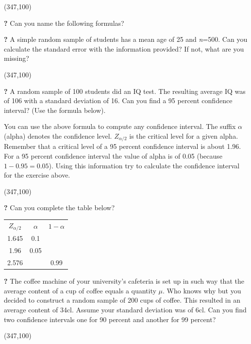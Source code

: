 \documentclass{article}
\newcommand{\forceindent}{\leavevmode{\parindent=2em\indent}}
\begin{document}
\framebox(347,100){}

\forceindent \textbf{?} Can you name the following formulas?

\begin{center}
\end{center}

\begin{center}
\end{center}

\begin{center}
\end{center}

\forceindent \textbf{?} A simple random sample of students has a mean age of 25 and \textit{n}=500. Can you calculate the standard error with the information provided? If not, what are you missing?

\framebox(347,100){}

\forceindent \textbf{?} A random sample of 100 students did an IQ test. The resulting average IQ was of 106 with a standard deviation of 16. Can you find a 95 percent confidence interval? (Use the formula below).

\begin{center}
\end{center}

You can use the above formula to compute any confidence interval. The suffix $\alpha$ (alpha) denotes the confidence level. $Z_{\alpha/2}$ is the critical level for a given alpha. Remember that a critical level of a 95 percent confidence interval is about 1.96. For a 95 percent confidence interval the value of alpha is of 0.05 (because $1-0.95=0.05$). Using this information try to calculate the confidence interval for the exercise above.

\framebox(347,100){}

\forceindent \textbf{?} Can you complete the table below?

\begin{table}[H]
	\centering
	\begin{tabular}{ccc}
		\textbf{$Z_{\alpha/2}$} & \textbf{$\alpha$} & \textbf{$1-\alpha$} \\
		1.645          & 0.1          &           \\
		1.96          & 0.05          &           \\
		2.576         &          & 0.99        
	\end{tabular}
\end{table}

\forceindent \textbf{?} The coffee machine of your university's cafeteria is set up in such way that the average content of a cup of coffee equals a quantity $\mu$. Who knows why but you decided to construct a random sample of 200 cups of coffee. This resulted in an average content of 34cl. Assume your standard deviation was of 6cl. Can you find two confidence intervals one for 90 percent and another for 99 percent?

\framebox(347,100){}
\end{document}
